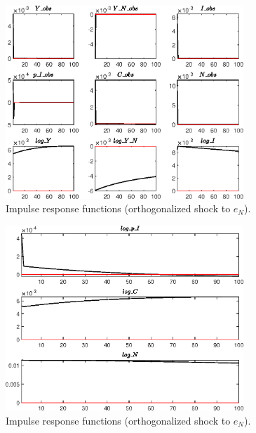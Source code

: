 \begin{figure}[H]
\centering 
\includegraphics[width=0.80\textwidth]{BRS_growth_res/graphs/BRS_growth_res_IRF_e_N1}
\caption{Impulse response functions (orthogonalized shock to ${e_N}$).}\label{Fig:IRF:e_N:1}
\end{figure}
 
\begin{figure}[H]
\centering 
\includegraphics[width=0.80\textwidth]{BRS_growth_res/graphs/BRS_growth_res_IRF_e_N2}
\caption{Impulse response functions (orthogonalized shock to ${e_N}$).}\label{Fig:IRF:e_N:2}
\end{figure}
 
